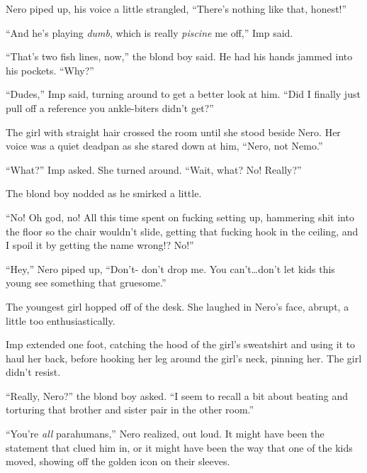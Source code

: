 Nero piped up, his voice a little strangled, ``There's nothing like that, honest!''



``And he's playing \emph{dumb}, which is really \emph{piscine }me off,'' Imp said.



``That's two fish lines, now,'' the blond boy said.  He had his hands jammed into his pockets.  ``Why?''



``Dudes,'' Imp said, turning around to get a better look at him.  ``Did I finally just pull off a reference you ankle-biters didn't get?''



The girl with straight hair crossed the room until she stood beside Nero.  Her voice was a quiet deadpan as she stared down at him, ``Nero, not Nemo.''



``What?''  Imp asked.  She turned around.  ``Wait, what?  No!  Really?''



The blond boy nodded as he smirked a little.



``No!  Oh god, no!  All this time spent on fucking setting up, hammering shit into the floor so the chair wouldn't slide, getting that fucking hook in the ceiling, and I spoil it by getting the name wrong!?  No!''



``Hey,'' Nero piped up, ``Don't- don't drop me.  You can't\ldots don't let kids this young see something that gruesome.''



The youngest girl hopped off of the desk.  She laughed in Nero's face, abrupt, a little too enthusiastically.



Imp extended one foot, catching the hood of the girl's sweatshirt and using it to haul her back, before hooking her leg around the girl's neck, pinning her.  The girl didn't resist.



``Really, Nero?'' the blond boy asked.  ``I seem to recall a bit about beating and torturing that brother and sister pair in the other room.''



``You're \emph{all} parahumans,'' Nero realized, out loud.  It might have been the statement that clued him in, or it might have been the way that one of the kids moved, showing off the golden icon on their sleeves.



